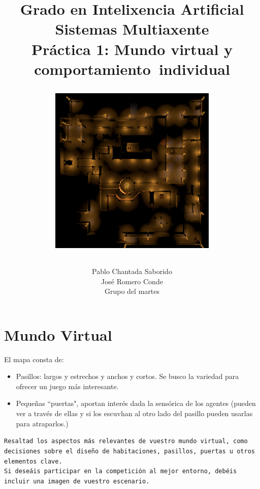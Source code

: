 \documentclass[a4paper,12pt]{article}
\begin{document}
\title{\vspace{-70pt}\begingroup  
    \centering
    \large Grado en Intelixencia Artificial\\
    \large Sistemas Multiaxente\\[0.5em]
    \large \textbf{Práctica 1: Mundo virtual y comportamiento~individual}\par 
    \vspace{20}
    \includegraphics[width=0.6\textwidth]{mapa.png}\\
\endgroup}
\author{Pablo Chantada Saborido \\ José Romero Conde \\ Grupo del martes}

\date{}
\maketitle
\vspace{-30pt}


\section*{\large Mundo Virtual}

El mapa consta de:
\begin{itemize}
\item  Pasillos: largos y estrechos y anchos y cortos. Se busco la variedad para ofrecer un juego más interesante.
\item  Pequeñas ``puertas", aportan interés dada la sensórica de los agentes (pueden ver a través de ellas y si los escuvhan al otro lado del pasillo pueden usarlas para atraparlos.) 
\end{itemize}
\texttt{Resaltad los aspectos más relevantes de vuestro mundo virtual, como decisiones sobre el diseño de habitaciones, pasillos, puertas u otros elementos clave. \\ Si deseáis participar en la competición al mejor entorno, debéis incluir una imagen de vuestro escenario.}
\end{document}
